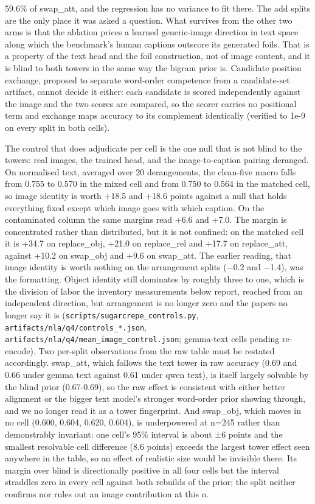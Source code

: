 \documentclass[
  11pt,
]{article}
\begin{document}
59.6\% of swap\_att, and the regression has no variance to fit there.
The add splits are the only place it was asked a question. What survives
from the other two arms is that the ablation prices a learned
generic-image direction in text space along which the benchmark's human
captions outscore its generated foils. That is a property of the text
head and the foil construction, not of image content, and it is blind to
both towers in the same way the bigram prior is. Candidate position
exchange, proposed to separate word-order competence from a
candidate-set artifact, cannot decide it either: each candidate is
scored independently against the image and the two scores are compared,
so the scorer carries no positional term and exchange maps accuracy to
its complement identically (verified to 1e-9 on every split in both
cells).

The control that does adjudicate per cell is the one null that is not
blind to the towers: real images, the trained head, and the
image-to-caption pairing deranged. On normalised text, averaged over 20
derangements, the clean-five macro falls from 0.755 to 0.570 in the
mixed cell and from 0.750 to 0.564 in the matched cell, so image
identity is worth +18.5 and +18.6 points against a null that holds
everything fixed except which image goes with which caption. On the
contaminated column the same margins read +6.6 and +7.0. The margin is
concentrated rather than distributed, but it is not confined: on the
matched cell it is +34.7 on replace\_obj, +21.0 on replace\_rel and
+17.7 on replace\_att, against +10.2 on swap\_obj and +9.6 on swap\_att.
The earlier reading, that image identity is worth nothing on the
arrangement splits (−0.2 and −1.4), was the formatting. Object identity
still dominates by roughly three to one, which is the division of labor
the inventory measurements below report, reached from an independent
direction, but arrangement is no longer zero and the papers no longer
say it is (\texttt{scripts/sugarcrepe\_controls.py},
\texttt{artifacts/nla/q4/controls\_*.json},
\texttt{artifacts/nla/q4/mean\_image\_control.json}; gemma-text cells
pending re-encode). Two per-split observations from the raw table must
be restated accordingly. swap\_att, which follows the text tower in raw
accuracy (0.69 and 0.66 under gemma text against 0.61 under qwen text),
is itself largely solvable by the blind prior (0.67-0.69), so the raw
effect is consistent with either better alignment or the bigger text
model's stronger word-order prior showing through, and we no longer read
it as a tower fingerprint. And swap\_obj, which moves in no cell (0.600,
0.604, 0.620, 0.604), is underpowered at n=245 rather than demonstrably
invariant: one cell's 95\% interval is about ±6 points and the smallest
resolvable cell difference (8.6 points) exceeds the largest tower effect
seen anywhere in the table, so an effect of realistic size would be
invisible there. Its margin over blind is directionally positive in all
four cells but the interval straddles zero in every cell against both
rebuilds of the prior; the split neither confirms nor rules out an image
contribution at this n.
\end{document}
